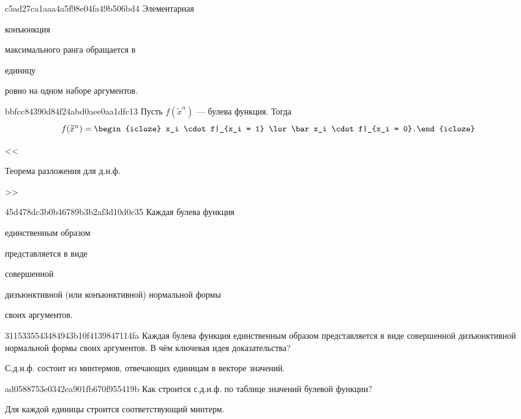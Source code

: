 \begin{note}{c5ad27ca1aaa4a5f98e04fa49b506bd4}
    Элементарная \begin{icloze}{1}конъюнкция\end{icloze} максимального ранга обращается в \begin{icloze}{2}единицу\end{icloze} ровно на одном наборе аргументов.
\end{note}

\begin{note}{bbfcc84390d84f24abd0aee0aa1dfc13}
    Пусть \({ f(\widetilde x^{n}) }\) --- булева функция.
    Тогда
    \[
        f(\widetilde x^{n}) = \begin{icloze}{1}x_i \cdot f|_{x_i = 1} \lor \bar x_i \cdot f|_{x_i = 0}.\end{icloze}
    \]

    \begin{center}
        \tiny
        <<\begin{icloze}{2}Теорема разложения для д.н.ф.\end{icloze}>>
    \end{center}
\end{note}

\begin{note}{45d478dc3b0b46789b3b2af3d10d0c35}
    Каждая булева функция \begin{icloze}{3}единственным образом\end{icloze} представляется в виде \begin{icloze}{1}совершенной\end{icloze} дизъюнктивной (или конъюнктивной) нормальной формы \begin{icloze}{2}своих аргументов.\end{icloze}
\end{note}

\begin{note}{3115335543484943b10f4139847114fa}
    Каждая булева функция единственным образом представляется в виде совершенной дизъюнктивной нормальной формы своих аргументов.
    В чём ключевая идея доказательства?

    \begin{cloze}{1}
        С.д.н.ф. состоит из минтермов, отвечающих единицам в векторе значений.
    \end{cloze}
\end{note}

\begin{note}{ad0588753e0342ea901fb670f955419b}
    Как строится с.д.н.ф. по таблице значений булевой функции?

    \begin{cloze}{1}
        Для каждой единицы строится соответствующий минтерм.
   \end{cloze}
\end{note}

